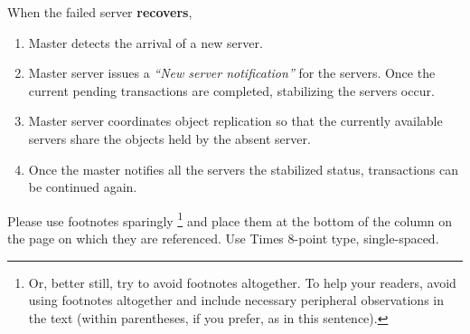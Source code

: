 \documentclass[times, 10pt,twocolumn]{article}
\begin{document}
When the failed server {\bf recovers},
\begin{enumerate}
\item Master detects the arrival of a new server.
\item Master server issues a {\it “New server notification”} for the servers. Once the current pending transactions are completed, stabilizing the servers occur.
\item Master server coordinates object replication so that the currently available servers share the objects held by the absent server.
\item Once the master notifies all the servers the stabilized status, transactions can be continued again.
\end{enumerate}


Please use footnotes sparingly%
\footnote
   {%
     Or, better still, try to avoid footnotes altogether.  To help your 
     readers, avoid using footnotes altogether and include necessary 
     peripheral observations in the text (within parentheses, if you 
     prefer, as in this sentence).
   }
and place them at the bottom of the column on the page on which they are 
referenced. Use Times 8-point type, single-spaced.






\end{document}

